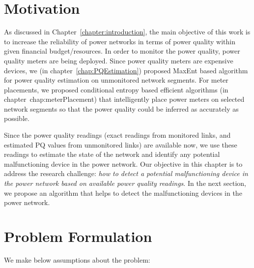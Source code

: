 \documentclass[12pt,oneside]{book}
\begin{document}
\label{chap:predictionModel}
\section{Motivation}
As discussed in Chapter~\ref{chapter:introduction}, the main objective of this work is to increase the reliability of power networks in terms of power quality within given financial budget/resources. In order to monitor the power quality, power quality meters are being deployed. Since power quality meters are expensive devices, we (in chapter~\ref{chap:PQEstimation}) proposed MaxEnt based algorithm for power quality estimation on unmonitored network segments. For meter placements, we proposed conditional entropy based efficient algorithms (in chapter~{chap:meterPlacement}) that intelligently place power meters on selected network segments so that the power quality could be inferred as accurately as possible.

Since the power quality readings (exact readings from monitored links, and estimated PQ values from unmonitored links) are available now, we use these readings to estimate the state of the network and identify any potential malfunctioning device in the power network. Our objective in this chapter is to address the research challenge: \textit{how to detect a potential malfunctioning device in the power network based on available power quality readings}. In the next section, we propose an algorithm that helps to detect the malfunctioning devices in the power network.

\section{Problem Formulation}
We make below assumptions about the problem:
\end{document}
